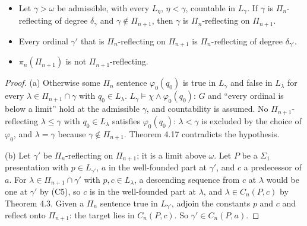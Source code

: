 \documentclass[11pt]{article}
\begin{document}
\begin{statement}
\begin{itemize}
\item[(a)] Let $\gamma > \omega$ be admissible, with every $L_\eta$, $\eta < \gamma$, countable in $L_\gamma$. If
  $\gamma$ is $\Pi_n$-reflecting of degree $\delta_\gamma$ and $\gamma \notin \Pi_{n+1}$, then $\gamma$ is $\Pi_n$-reflecting
  on $\Pi_{n+1}$.
\item[(b)] Every ordinal $\gamma'$ that is $\Pi_n$-reflecting on $\Pi_{n+1}$ is $\Pi_n$-reflecting of degree
  $\delta_{\gamma'}$.
\item[(c)] $\pi_n(\Pi_{n+1})$ is not $\Pi_{n+1}$-reflecting.
\end{itemize}
\end{statement}

\begin{proof}
(a) Otherwise some $\Pi_n$ sentence $\varphi_0(q_0)$ is true in $L_\gamma$ and false in $L_\lambda$ for every $\lambda
\in \Pi_{n+1} \cap \gamma$ with $q_0 \in L_\lambda$. $L_\gamma \models \chi \wedge \varphi_0(q_0)$: $G$ and ``every ordinal is
below a limit'' hold at the admissible $\gamma$, and countability is assumed. No $\Pi_{n+1}$-reflecting $\lambda \le
\gamma$ with $q_0 \in L_\lambda$ satisfies $\varphi_0(q_0)$: $\lambda < \gamma$ is excluded by the choice of
$\varphi_0$, and $\lambda = \gamma$ because $\gamma \notin \Pi_{n+1}$. Theorem 4.17 contradicts the hypothesis.

(b) Let $\gamma'$ be $\Pi_n$-reflecting on $\Pi_{n+1}$; it is a limit above $\omega$. Let $P$ be a $\Sigma_1$ presentation
with $p \in L_{\gamma'}$, $a$ in the well-founded part at $\gamma'$, and $c$ a predecessor of $a$. For $\lambda \in \Pi_{n+1}
\cap \gamma'$ with $p, c \in L_\lambda$, a descending sequence from $c$ at $\lambda$ would be one at $\gamma'$ by
(C5), so $c$ is in the well-founded part at $\lambda$, and $\lambda \in C_n(P, c)$ by Theorem 4.3. Given a $\Pi_n$
sentence true in $L_{\gamma'}$, adjoin the constants $p$ and $c$ and reflect onto $\Pi_{n+1}$: the target lies in $C_n(P,c)$.
So $\gamma' \in C_n(P,a)$.


\end{proof}
\end{document}
